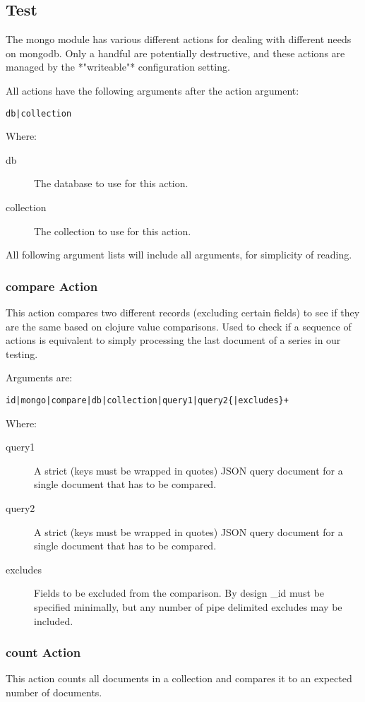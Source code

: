 \documentclass[12pt,a4paper,koma]{article}
\begin{document}
\subsection{Test}
\label{sec-3-2}
The mongo module has various different actions for dealing with different needs
on mongodb. Only a handful are potentially destructive, and these actions are
managed by the *"writeable"* configuration setting.

All actions have the following arguments after the action argument:
\begin{verbatim}
db|collection
\end{verbatim}

Where:
\begin{description}
\item[{db}] The database to use for this action.
\item[{collection}] The collection to use for this action.
\end{description}

All following argument lists will include all arguments, for simplicity
of reading.

\subsubsection{compare Action}
\label{sec-3-2-1}

This action compares two different records (excluding certain fields) to see
if they are the same based on clojure value comparisons. Used to check if a
sequence of actions is equivalent to simply processing the last document of
a series in our testing.

Arguments are:
\begin{verbatim}
id|mongo|compare|db|collection|query1|query2{|excludes}+
\end{verbatim}

Where:
\begin{description}
\item[{query1}] A strict (keys must be wrapped in quotes) JSON query document for
a single document that has to be compared.
\item[{query2}] A strict (keys must be wrapped in quotes) JSON query document for
a single document that has to be compared.
\item[{excludes}] Fields to be excluded from the comparison. By design \_id must
be specified minimally, but any number of pipe delimited excludes may be
included.
\end{description}
\subsubsection{count Action}
\label{sec-3-2-2}
This action counts all documents in a collection and compares it to an
expected number of documents.
\end{document}
